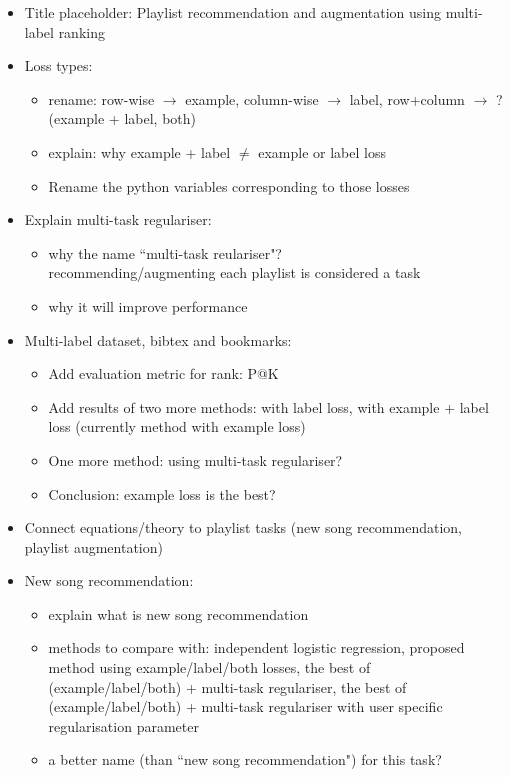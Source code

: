 \TODO

\begin{itemize}
\item Title placeholder: Playlist recommendation and augmentation using multi-label ranking

\item Loss types: 
      \begin{itemize}
      \item rename:  row-wise $\to$ example, column-wise $\to$ label, row+column $\to$ ? (example + label, both)
      \item explain: why example + label $\ne$ example or label loss
      \item Rename the python variables corresponding to those losses
      \end{itemize}
\item Explain multi-task regulariser:
      \begin{itemize}
      \item why the name ``multi-task reulariser"? \\
            recommending/augmenting each playlist is considered a task
      \item why it will improve performance
      \end{itemize}
\item Multi-label dataset, \ie bibtex and bookmarks:
      \begin{itemize}
      \item Add evaluation metric for rank: \eg P@K
      \item Add results of two more methods: with label loss, with example + label loss (currently method with example loss)
      \item One more method: using multi-task regulariser?
      \item Conclusion: example loss is the best?
      \end{itemize}

\item Connect equations/theory to playlist tasks (new song recommendation, playlist augmentation)

\item New song recommendation:
      \begin{itemize}
      \item explain what is new song recommendation
      \item methods to compare with: independent logistic regression, proposed method using example/label/both losses, 
            the best of (example/label/both) + multi-task regulariser, 
            the best of (example/label/both) + multi-task regulariser with user specific regularisation parameter
      \item a better name (than ``new song recommendation") for this task?
      \end{itemize}


\end{itemize}
